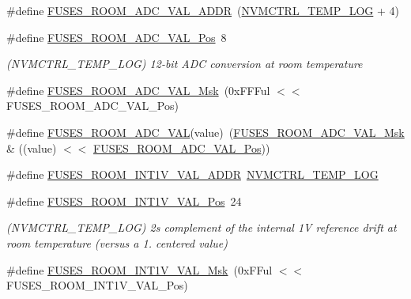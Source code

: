 \begin{DoxyCompactItemize}
\item 
\#define \mbox{\hyperlink{group__fuses__api_ga124754058b563fa0227d2ba9c258bd58}{F\+U\+S\+E\+S\+\_\+\+R\+O\+O\+M\+\_\+\+A\+D\+C\+\_\+\+V\+A\+L\+\_\+\+A\+D\+DR}}~(\mbox{\hyperlink{group___s_a_m_d21_j18_a__base_gae900d443ec6d7cf1c90d21b6662fa447}{N\+V\+M\+C\+T\+R\+L\+\_\+\+T\+E\+M\+P\+\_\+\+L\+OG}} + 4)
\item 
\#define \mbox{\hyperlink{group__fuses__api_ga91faceb6e2669f510f7a325fb1fd5748}{F\+U\+S\+E\+S\+\_\+\+R\+O\+O\+M\+\_\+\+A\+D\+C\+\_\+\+V\+A\+L\+\_\+\+Pos}}~8
\begin{DoxyCompactList}\small\item\em (N\+V\+M\+C\+T\+R\+L\+\_\+\+T\+E\+M\+P\+\_\+\+L\+OG) 12-\/bit A\+DC conversion at room temperature \end{DoxyCompactList}\item 
\#define \mbox{\hyperlink{group__fuses__api_gaa4fb448b0ef1d623e6c109535872d80b}{F\+U\+S\+E\+S\+\_\+\+R\+O\+O\+M\+\_\+\+A\+D\+C\+\_\+\+V\+A\+L\+\_\+\+Msk}}~(0x\+F\+F\+Ful $<$$<$ F\+U\+S\+E\+S\+\_\+\+R\+O\+O\+M\+\_\+\+A\+D\+C\+\_\+\+V\+A\+L\+\_\+\+Pos)
\item 
\#define \mbox{\hyperlink{group__fuses__api_ga7b4d8ebb648f2f48c4f6eb0250d2c6bb}{F\+U\+S\+E\+S\+\_\+\+R\+O\+O\+M\+\_\+\+A\+D\+C\+\_\+\+V\+AL}}(value)~(\mbox{\hyperlink{group__fuses__api_gaa4fb448b0ef1d623e6c109535872d80b}{F\+U\+S\+E\+S\+\_\+\+R\+O\+O\+M\+\_\+\+A\+D\+C\+\_\+\+V\+A\+L\+\_\+\+Msk}} \& ((value) $<$$<$ \mbox{\hyperlink{group__fuses__api_ga91faceb6e2669f510f7a325fb1fd5748}{F\+U\+S\+E\+S\+\_\+\+R\+O\+O\+M\+\_\+\+A\+D\+C\+\_\+\+V\+A\+L\+\_\+\+Pos}}))
\item 
\#define \mbox{\hyperlink{group__fuses__api_ga04a2707338ea7270dda29b72dfe3b16d}{F\+U\+S\+E\+S\+\_\+\+R\+O\+O\+M\+\_\+\+I\+N\+T1\+V\+\_\+\+V\+A\+L\+\_\+\+A\+D\+DR}}~\mbox{\hyperlink{group___s_a_m_d21_j18_a__base_gae900d443ec6d7cf1c90d21b6662fa447}{N\+V\+M\+C\+T\+R\+L\+\_\+\+T\+E\+M\+P\+\_\+\+L\+OG}}
\item 
\#define \mbox{\hyperlink{group__fuses__api_gaac3dee19f6ada7e3e76edabd527b521d}{F\+U\+S\+E\+S\+\_\+\+R\+O\+O\+M\+\_\+\+I\+N\+T1\+V\+\_\+\+V\+A\+L\+\_\+\+Pos}}~24
\begin{DoxyCompactList}\small\item\em (N\+V\+M\+C\+T\+R\+L\+\_\+\+T\+E\+M\+P\+\_\+\+L\+OG) 2\textquotesingle{}s complement of the internal 1V reference drift at room temperature (versus a 1. centered value) \end{DoxyCompactList}\item 
\#define \mbox{\hyperlink{group__fuses__api_ga063fd7b71cd24c82b856e96d490f3cd8}{F\+U\+S\+E\+S\+\_\+\+R\+O\+O\+M\+\_\+\+I\+N\+T1\+V\+\_\+\+V\+A\+L\+\_\+\+Msk}}~(0x\+F\+Ful $<$$<$ F\+U\+S\+E\+S\+\_\+\+R\+O\+O\+M\+\_\+\+I\+N\+T1\+V\+\_\+\+V\+A\+L\+\_\+\+Pos)
$$
\end{DoxyCompactItemize}
